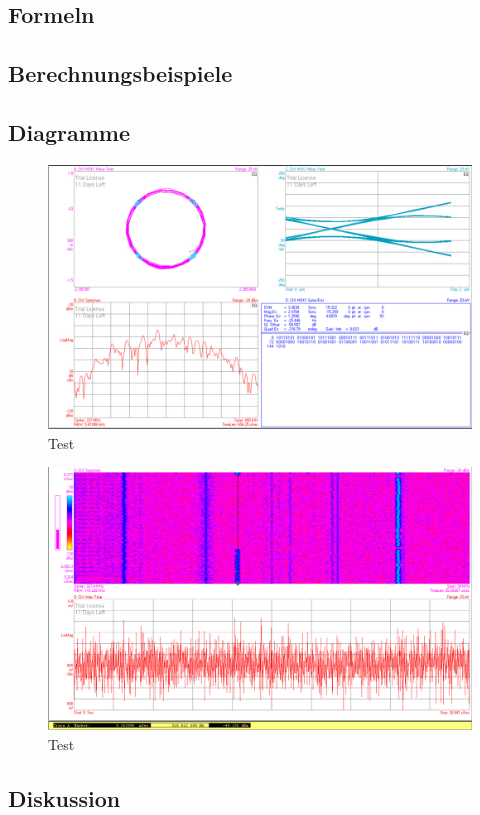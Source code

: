 \documentclass[12pt,a4paper,ngerman]{article}
\begin{document}
\subsection{Formeln}

\subsection{Berechnungsbeispiele}

\subsection{Diagramme}
\begin{figure}[H]
\centering
\includegraphics[width=\textwidth]{figures/Aufgabe4_demod.jpg} 
\caption{Test}
\end{figure}

\begin{figure}[H]
\centering
\includegraphics[width=\textwidth]{figures/Aufgabe4_Spektrogramm.jpg} 
\caption{Test}
\end{figure}




\subsection{Diskussion}


 



   
\end{document}
